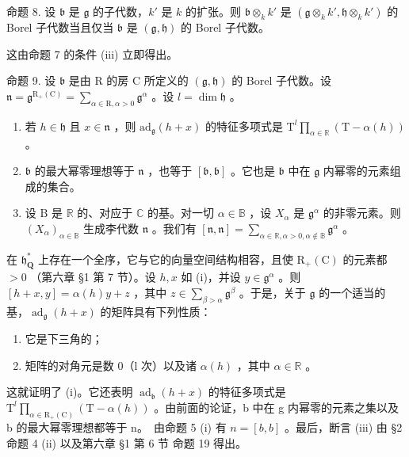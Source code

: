命题 8. 设 \(\mathfrak{b}\) 是 \(\mathfrak{g}\) 的子代数，\(k'\) 是 \(k\) 的扩张。则 \(\mathfrak{b} \otimes_k k'\) 是 \((\mathfrak{g} \otimes_k k', \mathfrak{h} \otimes_k k')\) 的 Borel 子代数当且仅当 \(\mathfrak{b}\) 是 \((\mathfrak{g}, \mathfrak{h})\) 的 Borel 子代数。

这由命题 7 的条件 (iii) 立即得出。

命题 9. 设 \(\mathfrak{b}\) 是由 R 的房 C 所定义的 \((\mathfrak{g},\mathfrak{h})\) 的 Borel 子代数。设 \(\mathfrak{n} = \mathfrak{g}^{\mathrm{R}_{+}(\mathrm{C})} = \sum_{\alpha \in \mathrm{R},\alpha >0}\mathfrak{g}^{\alpha}\) 。设 \(l = \dim \mathfrak{h}\) 。

\begin{enumerate}
\def\labelenumi{(\roman{enumi})}
\item
  若 \(h \in \mathfrak{h}\) 且 \(x \in \mathfrak{n}\) ，则 \(\mathrm{ad}_{\mathfrak{g}}(h + x)\) 的特征多项式是 \(\mathrm{T}^l \prod_{\alpha \in \mathbb{R}} (\mathrm{T} - \alpha(h))\) 。
\item
  \(\mathfrak{b}\) 的最大幂零理想等于 \(\mathfrak{n}\) ，也等于 \([\mathfrak{b},\mathfrak{b}]\) 。它也是 \(\mathfrak{b}\) 中在 \(\mathfrak{g}\) 内幂零的元素组成的集合。
\item
  设 \(\mathrm{B}\) 是 \(\mathbb{R}\) 的、对应于 \(\mathbb{C}\) 的基。对一切 \(\alpha \in \mathbb{B}\) ，设 \(X_{\alpha}\) 是 \(\mathfrak{g}^{\alpha}\) 的非零元素。则 \((X_{\alpha})_{\alpha \in \mathbb{B}}\) 生成李代数 \(\mathfrak{n}\) 。我们有 \([\mathfrak{n}, \mathfrak{n}] = \sum_{\alpha \in \mathbb{R}, \alpha > 0, \alpha \notin \mathbb{B}} \mathfrak{g}^{\alpha}\) 。
\end{enumerate}

在 \(\mathfrak{h}_{\mathbf{Q}}^{*}\) 上存在一个全序，它与它的向量空间结构相容，且使 \(\mathrm{R}_{+}(\mathrm{C})\) 的元素都 \(>0\) （第六章 §1 第 7 节）。设 \(h, x\) 如 (i)，并设 \(y \in \mathfrak{g}^{\alpha}\) 。则 \([h + x, y] = \alpha(h)y + z\) ，其中 \(z \in \sum_{\beta > \alpha} \mathfrak{g}^{\beta}\) 。于是，关于 \(\mathfrak{g}\) 的一个适当的基，\(\operatorname{ad}_{\mathfrak{g}}(h + x)\) 的矩阵具有下列性质：

\begin{enumerate}
\def\labelenumi{\arabic{enumi})}
\item
  它是下三角的；
\item
  矩阵的对角元是数 0（l 次）以及诸 \(\alpha(h)\) ，其中 \(\alpha \in \mathbb{R}\) 。
\end{enumerate}

这就证明了 (i)。它还表明 \(\operatorname{ad}_{\mathfrak{b}}(h+x)\) 的特征多项式是 \(\mathrm{T}^{l}\prod_{\alpha\in\mathrm{R}_{+}(\mathrm{C})}(\mathrm{T}-\alpha(h))\) 。由前面的论证，b 中在 g 内幂零的元素之集以及 b 的最大幂零理想都等于 n。~由命题 5 (i) 有 \(n=[b,b]\) 。最后，断言 (iii) 由 §2 命题 4 (ii) 以及第六章 §1 第 6 节 命题 19 得出。

